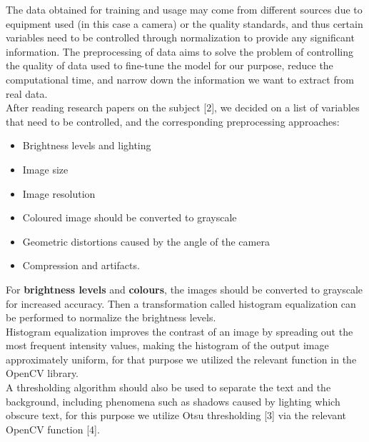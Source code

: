 \documentclass[twoside,a4paper]{article}
\begin{document}
The data obtained for training and usage may come from different sources due to equipment used (in this case a camera) or the quality standards, and thus certain variables need to be controlled through normalization to provide any significant information. The preprocessing of data aims to solve the problem of controlling the quality of data used to fine-tune the model for our purpose, reduce the computational time, and narrow down the information we want to extract from real data.\\
After reading research papers on the subject [2], we decided on a list of variables that need to be controlled, and the corresponding preprocessing approaches:
\begin{itemize}
    \item Brightness levels and lighting
    \item Image size
    \item Image resolution
    \item Coloured image should be converted to grayscale
    \item Geometric distortions caused by the angle of the camera
    \item Compression and artifacts.
\end{itemize}
For \textbf{brightness levels} and \textbf{colours}, the images should be converted to grayscale for increased accuracy. Then a transformation called histogram equalization can be performed to normalize the brightness levels.\\
Histogram equalization improves the contrast of an image by spreading out the most frequent intensity values, making the histogram of the output image approximately uniform, for that purpose we utilized the relevant function in the OpenCV library.~\cite{OpenCV_Histogram_Equalization}\\
A thresholding algorithm should also be used to separate the text and the background, including phenomena such as shadows caused by lighting which obscure text, for this purpose we utilize Otsu thresholding [3] via the relevant OpenCV function [4].
\end{document}
